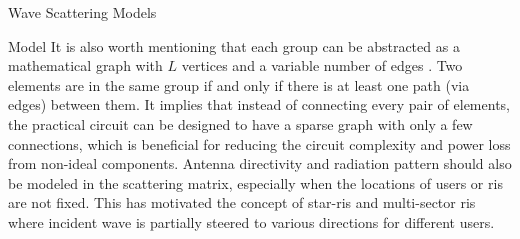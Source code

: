 \begin{section}{}
\begin{subsection}{Wave Scattering Models}
\begin{subsubsection}{ Model}
			It is also worth mentioning that each group can be abstracted as a mathematical graph with $L$ vertices and a variable number of edges \cite{Nerini2024}.
			Two elements are in the same group if and only if there is at least one path (via edges) between them.
			It implies that instead of connecting every pair of elements, the practical circuit can be designed to have a sparse graph with only a few connections, which is beneficial for reducing the circuit complexity and power loss from non-ideal components.
			Antenna directivity and radiation pattern should also be modeled in the scattering matrix, especially when the locations of users or \gls{ris} are not fixed.
			This has motivated the concept of \gls{star}-\gls{ris} \cite{Mu2021,Liu2021} and multi-sector \gls{ris} \cite{Li2023c} where incident wave is partially steered to various directions for different users.
		\end{subsubsection}
	\end{subsection}
\end{section}

